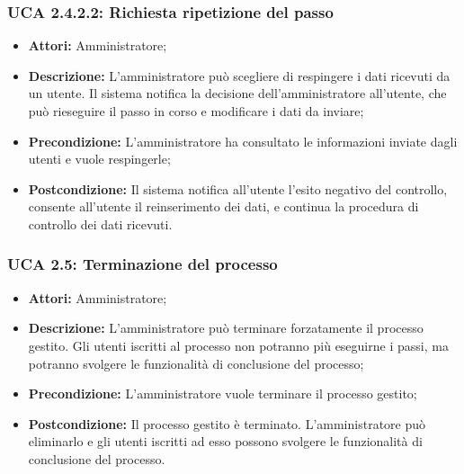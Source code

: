 \hypertarget{A2.4.2.2}{}
\subsubsection{UCA 2.4.2.2: Richiesta ripetizione del passo}
\begin{itemize}
\item \textbf{Attori:}
 Amministratore;
\item \textbf{Descrizione:} 
L'amministratore può scegliere di respingere i dati ricevuti da un utente. Il sistema notifica la decisione dell'amministratore all'utente, che può rieseguire il passo in corso e modificare i dati da inviare;
\item \textbf{Precondizione:} 
L'amministratore ha consultato le informazioni inviate dagli utenti e vuole respingerle;
\item \textbf{Postcondizione:} 
Il sistema notifica all'utente l'esito negativo del controllo, consente all'utente il reinserimento dei dati, e continua la procedura di controllo dei dati ricevuti.
\end{itemize}

\hypertarget{A2.5}{}
\subsubsection{UCA 2.5: Terminazione del processo}
\begin{itemize}
\item \textbf{Attori:} Amministratore;
\item \textbf{Descrizione:} 
L'amministratore può terminare forzatamente il processo gestito. Gli utenti iscritti al processo non potranno più eseguirne i passi, ma potranno svolgere le funzionalità di conclusione del processo; 
\item \textbf{Precondizione:} 
L'amministratore vuole terminare il processo gestito;
\item \textbf{Postcondizione:} 
Il processo gestito è terminato. L'amministratore può eliminarlo e gli utenti iscritti ad esso possono svolgere le funzionalità di conclusione del processo.
\end{itemize}

\hypertarget{A2.6}{}
